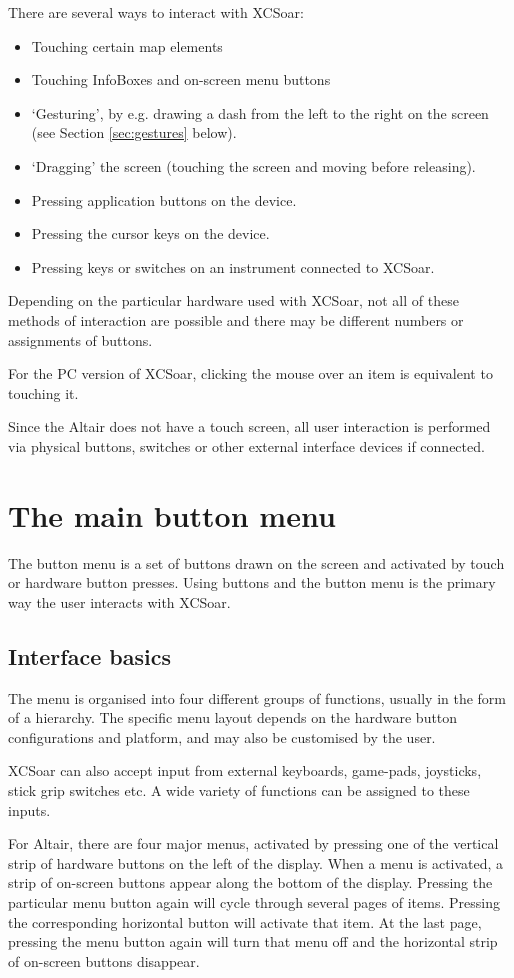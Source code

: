 There are several ways to interact with XCSoar:
\begin{itemize}
\item Touching certain map elements
\item Touching InfoBoxes and on-screen menu buttons
\item `Gesturing', by e.g. drawing a dash from the left to the right
  on the screen (see Section \ref{sec:gestures} below).
\item `Dragging' the screen (touching the screen and moving before releasing).
\item Pressing application buttons on the device.
\item Pressing the cursor keys on the device.
\item Pressing keys or switches on an instrument connected to XCSoar.
\end{itemize}
Depending on the particular hardware used with XCSoar, not all of these methods
of interaction are possible and there may be different numbers or assignments
of buttons.

For the PC version of XCSoar, clicking the mouse over an item is equivalent to
touching it.

Since the Altair does not have a touch screen, all user interaction is performed
via physical buttons, switches or other external interface devices if connected.

\section{The main button menu}
The button menu is a set of buttons drawn on the screen and activated by touch
or hardware button presses.  Using buttons and the button menu is the primary
way the user interacts with XCSoar.

\subsection*{Interface basics}
The menu is organised into four different groups of functions, usually in
the form of a hierarchy.  The specific menu layout depends on the
hardware button configurations and platform, and may also be customised by the
user.

XCSoar can also accept input from external keyboards, game-pads, joysticks,
stick grip switches etc. A wide variety of functions can be assigned to these
inputs.

For Altair, there are four major menus, activated by pressing one of
the vertical strip of hardware buttons on the left of the display.
When a menu is activated, a strip of on-screen buttons appear along the 
bottom of the display.  Pressing the particular menu button again will
cycle through several pages of items.  Pressing the corresponding
horizontal button will activate that item.  At the last page, pressing
the menu button again will turn that menu off and the horizontal strip
of on-screen buttons disappear.  

